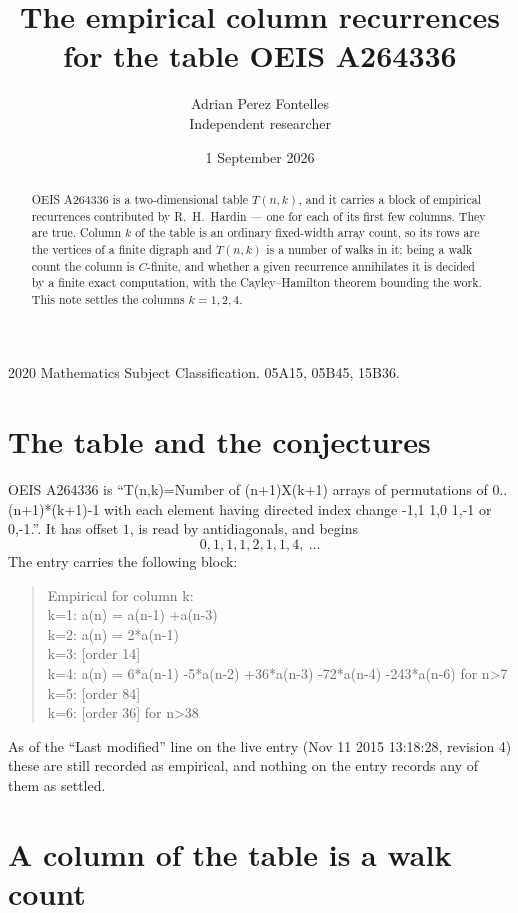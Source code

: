 \documentclass[11pt,a4paper]{article}
\title{The empirical column recurrences for the table OEIS A264336}
\author{Adrian Perez Fontelles\\ \small Independent researcher}
\date{1 September 2026}
\theoremstyle{plain}
\theoremstyle{definition}
\begin{document}
\maketitle

\begin{abstract}
OEIS A264336 is a two-dimensional table $T(n,k)$, and it carries a block of empirical
recurrences contributed by R.~H.~Hardin --- one for each of its first few columns. They are
true. Column $k$ of the table is an ordinary fixed-width array count, so its rows are the
vertices of a finite digraph and $T(n,k)$ is a number of walks in it; being a walk count the
column is $C$-finite, and whether a given recurrence annihilates it is decided by a finite
exact computation, with the Cayley--Hamilton theorem bounding the work. This note settles the columns $k=1, 2, 4$.
\end{abstract}

\noindent\small 2020 Mathematics Subject Classification. 05A15, 05B45, 15B36.\normalsize

\section{The table and the conjectures}

OEIS A264336 is ``T(n,k)=Number of (n+1)X(k+1) arrays of permutations of 0..(n+1)*(k+1)-1 with each element having directed index change -1,1 1,0 1,-1 or 0,-1.''. It has offset $1$, is
read by antidiagonals, and begins
\[
0, 1, 1, 1, 2, 1, 1, 4,\ \dots
\]
The entry carries the following block:
\begin{quote}\small
Empirical for column k:\\
k=1: a(n) = a(n-1) +a(n-3)\\
k=2: a(n) = 2*a(n-1)\\
k=3: [order 14]\\
k=4: a(n) = 6*a(n-1) -5*a(n-2) +36*a(n-3) -72*a(n-4) -243*a(n-6) for n>7\\
k=5: [order 84]\\
k=6: [order 36] for n>38\\
\end{quote}
As of the ``Last modified'' line on the live entry (Nov 11 2015 13:18:28, revision 4) these are still
recorded as empirical, and nothing on the entry records any of them as settled.

\section{A column of the table is a walk count}
\end{document}
